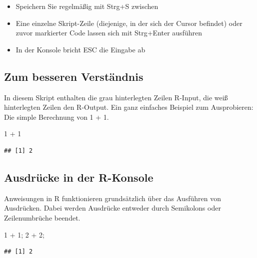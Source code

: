 \documentclass[
]{book}
\newenvironment{Shaded}{\begin{snugshade}}{\end{snugshade}}
\newcommand{\DecValTok}[1]{\textcolor[rgb]{0.00,0.00,0.81}{#1}}
\newcommand{\NormalTok}[1]{#1}
\newcommand{\SpecialCharTok}[1]{\textcolor[rgb]{0.00,0.00,0.00}{#1}}
\providecommand{\tightlist}{%
  \setlength{\itemsep}{0pt}\setlength{\parskip}{0pt}}
\begin{document}
\begin{itemize}
\tightlist
\item
  Speichern Sie regelmäßig mit Strg+S zwischen
\item
  Eine einzelne Skript-Zeile (diejenige, in der sich der Cursor befindet) oder zuvor markierter Code lassen sich mit Strg+Enter ausführen
\item
  In der Konsole bricht ESC die Eingabe ab
\end{itemize}

\hypertarget{zum-besseren-verstuxe4ndnis}{%
\subsection*{Zum besseren Verständnis}\label{zum-besseren-verstuxe4ndnis}}

In diesem Skript enthalten die grau hinterlegten Zeilen R-Input, die weiß hinterlegten Zeilen den R-Output. Ein ganz einfaches Beispiel zum Ausprobieren: Die simple Berechnung von 1 + 1.

\begin{Shaded}
\begin{Highlighting}[]
\DecValTok{1} \SpecialCharTok{+} \DecValTok{1}
\end{Highlighting}
\end{Shaded}

\begin{verbatim}
## [1] 2
\end{verbatim}

\hypertarget{ausdruxfccke-in-der-r-konsole}{%
\subsection*{Ausdrücke in der R-Konsole}\label{ausdruxfccke-in-der-r-konsole}}

Anweisungen in R funktionieren grundsätzlich über das Ausführen von Ausdrücken. Dabei werden Ausdrücke entweder durch Semikolons oder Zeilenumbrüche beendet.

\begin{Shaded}
\begin{Highlighting}[]
\DecValTok{1} \SpecialCharTok{+} \DecValTok{1}\NormalTok{; }\DecValTok{2} \SpecialCharTok{+} \DecValTok{2}\NormalTok{;}
\end{Highlighting}
\end{Shaded}

\begin{verbatim}
## [1] 2
\end{verbatim}
\end{document}
